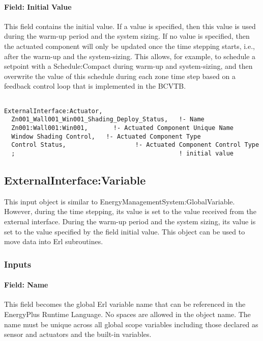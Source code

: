 \paragraph{Field: Initial Value}\label{field-initial-value-1}

This field contains the initial value. If a value is specified, then this value is used during the warm-up period and the system sizing. If no value is specified, then the actuated component will only be updated once the time stepping starts, i.e., after the warm-up and the system-sizing. This allows, for example, to schedule a setpoint with a Schedule:Compact during warm-up and system-sizing, and then overwrite the value of this schedule during each zone time step based on a feedback control loop that is implemented in the BCVTB.

\begin{lstlisting}

ExternalInterface:Actuator,
  Zn001_Wall001_Win001_Shading_Deploy_Status,   !- Name
  Zn001:Wall001:Win001,       !- Actuated Component Unique Name
  Window Shading Control,   !- Actuated Component Type
  Control Status,                   !- Actuated Component Control Type
  ;                                             ! initial value
\end{lstlisting}

\subsection{ExternalInterface:Variable}\label{externalinterfacevariable}

This input object is similar to EnergyManagementSystem:GlobalVariable. However, during the time stepping, its value is set to the value received from the external interface. During the warm-up period and the system sizing, its value is set to the value specified by the field initial value. This object can be used to move data into Erl subroutines.

\subsubsection{Inputs}\label{inputs-3-013}

\paragraph{Field: Name}\label{field-name-3-012}

This field becomes the global Erl variable name that can be referenced in the EnergyPlus Runtime Language. No spaces are allowed in the object name. The name must be unique across all global scope variables including those declared as sensor and actuators and the built-in variables.

